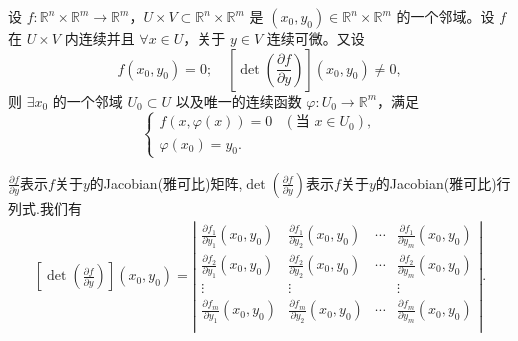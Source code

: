 \documentclass[../../main.tex]{subfiles}
\begin{document}
\begin{theorem}[隐函数存在定理]\label{theorem:隐函数存在定理}
设 \( f : \mathbb{R}^n \times \mathbb{R}^m \to \mathbb{R}^m \)，\( U \times V \subset \mathbb{R}^n \times \mathbb{R}^m \) 是 \( (x_0, y_0) \in \mathbb{R}^n \times \mathbb{R}^m \) 的一个邻域。设 \( f \) 在 \( U \times V \) 内连续并且 \( \forall x \in U \)，关于 \( y \in V \) 连续可微。又设
\[
f(x_0, y_0) = 0; \quad \left[ \det \left( \frac{\partial f}{\partial y} \right) \right] (x_0, y_0) \neq 0,
\]
则 \( \exists x_0 \) 的一个邻域 \( U_0 \subset U \) 以及唯一的连续函数 \( \varphi : U_0 \to \mathbb{R}^m \)，满足
\[
\begin{cases} 
f(x, \varphi(x)) = 0 & (\text{当 } x \in U_0), \\
\varphi(x_0) = y_0.
\end{cases}
\]
\end{theorem}
\begin{remark}
$\frac{\partial f}{\partial y}$表示$f$关于$y$的Jacobian(雅可比)矩阵,$\det \left( \frac{\partial f}{\partial y} \right)$表示$f$关于$y$的Jacobian(雅可比)行列式.我们有
\begin{align*}
\left[ \det \left( \frac{\partial f}{\partial y} \right) \right] (x_0,y_0)=\left| \begin{matrix}
\frac{\partial f_1}{\partial y_1}\left( x_0,y_0 \right)&		\frac{\partial f_1}{\partial y_2}\left( x_0,y_0 \right)&		\cdots&		\frac{\partial f_1}{\partial y_m}\left( x_0,y_0 \right)\\
\frac{\partial f_2}{\partial y_1}\left( x_0,y_0 \right)&		\frac{\partial f_2}{\partial y_2}\left( x_0,y_0 \right)&		\cdots&		\frac{\partial f_2}{\partial y_m}\left( x_0,y_0 \right)\\
\vdots&		\vdots&		&		\vdots\\
\frac{\partial f_m}{\partial y_1}\left( x_0,y_0 \right)&		\frac{\partial f_m}{\partial y_2}\left( x_0,y_0 \right)&		\cdots&		\frac{\partial f_m}{\partial y_m}\left( x_0,y_0 \right)\\
\end{matrix} \right| .
\end{align*}
\end{remark}
\end{document}
